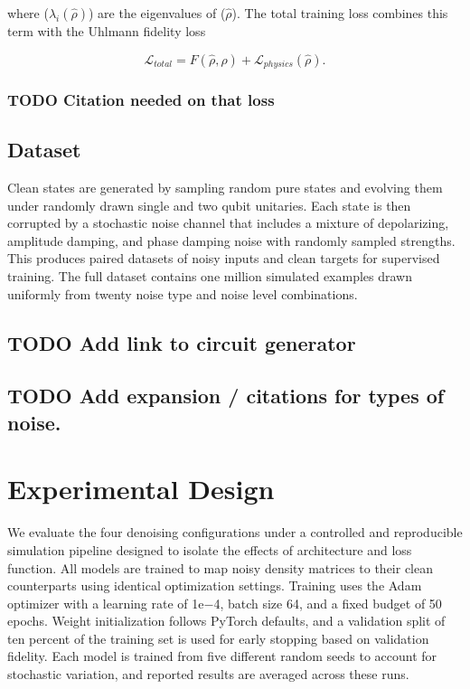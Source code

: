 \documentclass[11pt]{article}
\begin{document}
where (\(\lambda_i(\hat{\rho})\)) are the eigenvalues of (\(\hat{\rho}\)). The total training loss combines this term with the Uhlmann fidelity loss

$$
\mathcal{L}_{total} = F(\hat{\rho}, \rho) + \mathcal{L}_{physics}(\hat{\rho}).
$$
\subsubsection{{\bfseries\sffamily TODO} Citation needed on that loss}
\label{sec:org87e8977}
\subsection{Dataset}
\label{sec:org8f5997d}
Clean states are generated by sampling random pure states and evolving them under randomly drawn single and two qubit unitaries. Each state is then corrupted by a stochastic noise channel that includes a mixture of depolarizing, amplitude damping, and phase damping noise with randomly sampled strengths. This produces paired datasets of noisy inputs and clean targets for supervised training. The full dataset contains one million simulated examples drawn uniformly from twenty noise type and noise level combinations.
\subsection{{\bfseries\sffamily TODO} Add link to circuit generator}
\label{sec:org9b67fa1}
\subsection{{\bfseries\sffamily TODO} Add expansion / citations for types of noise.}
\label{sec:orgef1f7d0}
\section{Experimental Design}
\label{sec:orgf4a7e07}
We evaluate the four denoising configurations under a controlled and reproducible simulation pipeline designed to isolate the effects of architecture and loss function. All models are trained to map noisy density matrices to their clean counterparts using identical optimization settings. Training uses the Adam optimizer with a learning rate of 1e−4, batch size 64, and a fixed budget of 50 epochs. Weight initialization follows PyTorch defaults, and a validation split of ten percent of the training set is used for early stopping based on validation fidelity. Each model is trained from five different random seeds to account for stochastic variation, and reported results are averaged across these runs.
\end{document}
